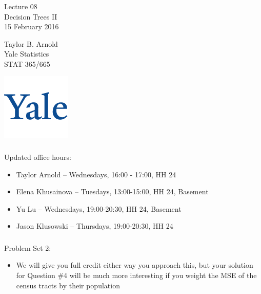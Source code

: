 \documentclass[xetex,mathserif,serif,aspectratio=169]{beamer}
\begin{document}
\begin{frame}[fragile] \frametitle{} \oldB \small

\vfill

{\fontsize{0.7cm}{0cm}\selectfont Lecture 08 \\\vspace{0.2cm} Decision Trees II}\\\vspace{0.5cm}
15 February 2016

\vspace{2cm}

\begin{minipage}{0.6\textwidth}
Taylor B. Arnold \\
Yale Statistics \\
STAT 365/665
\end{minipage}
\hfill
\begin{minipage}{0.3\textwidth}\raggedleft
\includegraphics[scale=0.3]{../yale-logo.png}
\end{minipage}%

\end{frame}

\begin{frame}[fragile] \frametitle{} \oldB \small

Updated office hours:
\begin{itemize}
\item Taylor Arnold -- Wednesdays, 16:00 - 17:00, HH 24
\item Elena Khusainova -- Tuesdays, 13:00-15:00, HH 24, Basement
\item Yu Lu -- Wednesdays, 19:00-20:30, HH 24, Basement
\item Jason Klusowski -- Thursdays, 19:00-20:30, HH 24
\end{itemize}

\end{frame}

\begin{frame}[fragile] \frametitle{} \oldB \small

Problem Set 2:
\begin{itemize}
\item We will give you full credit either way you approach this, but your
solution for Question \#4 will be much more interesting if you weight the
MSE of the census tracts by their population
\end{itemize}

\end{frame}
\end{document}
